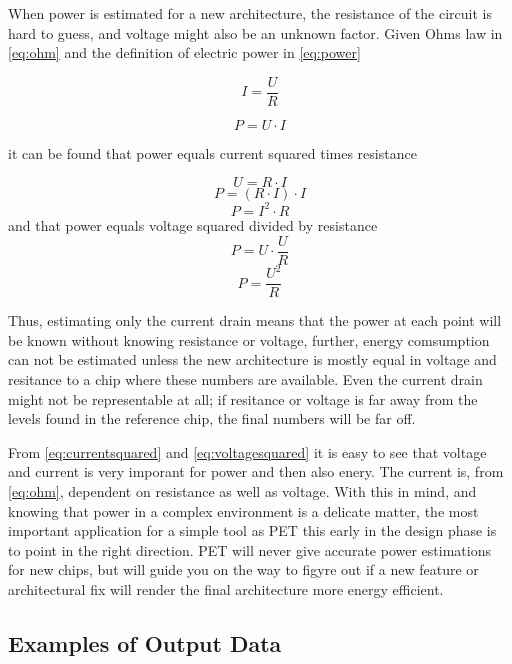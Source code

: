 When power is estimated for a new architecture, the resistance of the circuit is
hard to guess, and voltage might also be an unknown factor. Given Ohms law in
\autoref{eq:ohm} and the definition of electric power in \autoref{eq:power}

\begin{equation}
I=\frac{U}{R}
\label{eq:ohm}
\end{equation}

\begin{equation}
P=U \cdot I
\label{eq:power}
\end{equation}

it can be found that power equals current squared times resistance

\[U=R \cdot I\]
\[P=(R \cdot I) \cdot I\]
\begin{equation}
P=I^2 \cdot R
\label{eq:currentsquared}
\end{equation}
and that power equals voltage squared divided by resistance
\[P=U \cdot \frac{U}{R}\]
\begin{equation}
P=\frac{U^2}{R}
\label{eq:voltagesquared}
\end{equation}

Thus, estimating only the current drain means that the power at each point will
be known without knowing resistance or voltage, further, energy comsumption can
not be estimated unless the new architecture is mostly equal in voltage and
resitance to a chip where these numbers are available. Even the current drain
might not be representable at all; if resitance or voltage is far away from the
levels found in the reference chip, the final numbers will be far off.

From \autoref{eq:currentsquared} and \autoref{eq:voltagesquared} it is easy to
see that voltage and current is very imporant for power and then also enery. The
current is, from \autoref{eq:ohm}, dependent on resistance as well as voltage.
With this in mind, and knowing that power in a complex environment is a delicate
matter, the most important application for a simple tool as PET this early in
the design phase is to point in the right direction. PET will never give
accurate power estimations for new chips, but will guide you on the way to
figyre out if a new feature or architectural fix will render the final
architecture more energy efficient.


\subsection{Examples of Output Data}

